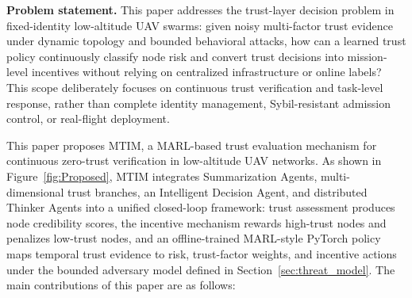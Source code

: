 \documentclass[notspecified,article,submit,moreauthors]{Definitions/mdpi}
\begin{document}
\textbf{Problem statement.}
This paper addresses the trust-layer decision problem in fixed-identity low-altitude UAV swarms: given noisy multi-factor trust evidence under dynamic topology and bounded behavioral attacks, how can a learned trust policy continuously classify node risk and convert trust decisions into mission-level incentives without relying on centralized infrastructure or online labels? This scope deliberately focuses on continuous trust verification and task-level response, rather than complete identity management, Sybil-resistant admission control, or real-flight deployment.

This paper proposes MTIM, a MARL-based trust evaluation mechanism for continuous zero-trust verification in low-altitude UAV networks. As shown in Figure~\ref{fig:Proposed}, MTIM integrates Summarization Agents, multi-dimensional trust branches, an Intelligent Decision Agent, and distributed Thinker Agents into a unified closed-loop framework: trust assessment produces node credibility scores, the incentive mechanism rewards high-trust nodes and penalizes low-trust nodes, and an offline-trained MARL-style PyTorch policy maps temporal trust evidence to risk, trust-factor weights, and incentive actions under the bounded adversary model defined in Section~\ref{sec:threat_model}. The main contributions of this paper are as follows:
\end{document}

